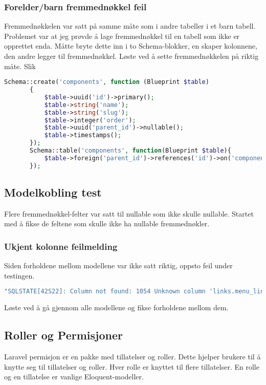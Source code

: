 \subsubsection{Forelder/barn fremmednøkkel feil}
Fremmednøkkelen var satt på samme måte som i andre tabeller i et barn tabell. Problemet var at jeg prøvde å lage fremmednøkkel til en tabell som ikke er opprettet enda.
Måtte bryte dette inn i to Schema-blokker, en skaper kolonnene, den andre legger til fremmednøkkel.\cite{meroje2013lmsrfki}
Løste ved å sette fremmednøkkelen på riktig måte. Slik
\begin{lstlisting}[language=PHP]
Schema::create('components', function (Blueprint $table)
       {
           $table->uuid('id')->primary();
           $table->string('name');
           $table->string('slug');
           $table->integer('order');
           $table->uuid('parent_id')->nullable();
           $table->timestamps();
       });
       Schema::table('components', function(Blueprint $table){
           $table->foreign('parent_id')->references('id')->on('components');
       });
\end{lstlisting}

\subsection{Modelkobling test}
Flere fremmednøkkel-felter var satt til nullable som ikke skulle nullable. Startet med å fikse de feltene som skulle ikke ha nullable fremmednøkler.

\subsubsection{Ukjent kolonne feilmelding}
Siden forholdene mellom modellene var ikke satt riktig, oppsto feil under testingen.
\begin{lstlisting}[language=PHP]
"SQLSTATE[42S22]: Column not found: 1054 Unknown column 'links.menu_link_id' in 'where clause' (SQL: select * from links where links.`menu_link_id` = 3 and links.`menu_link_id` is not null) 
\end{lstlisting}
Løste ved å gå gjennom alle modellene og fikse forholdene mellom dem.

\subsection{Roller og Permisjoner}\cite{spatie2019aupar}
Laravel permisjon er en pakke med tillatelser og roller. Dette hjelper brukere til å knytte seg til tillatelser og roller. Hver rolle er knyttet til flere tillatelser. En rolle og en tillatelse er vanlige Eloquent-modeller\cite{oki2017uail}.
